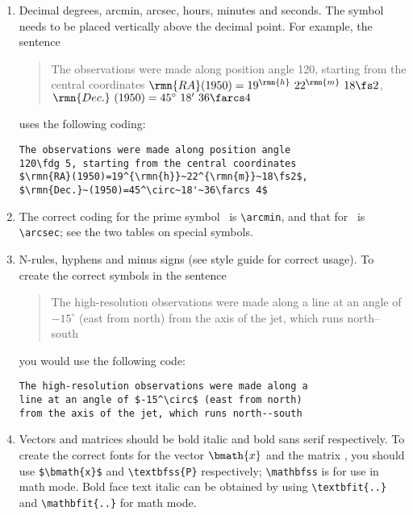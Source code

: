 \begin{enumerate}
\item Decimal degrees, arcmin, arcsec, hours, minutes and seconds. 
The symbol needs to be placed vertically above the decimal point. 
For example, the sentence
%
\begin{quote}
The observations were made along position angle
120, starting from the central coordinates
$\rmn{RA}(1950)=19^{\rmn{h}}~22^{\rmn{m}}~18\fs2$,
$\rmn{Dec.}~(1950)=45^\circ~18'~36\farcs 4$
\end{quote}
%        
uses the following coding:
%
\begin{verbatim}
The observations were made along position angle
120\fdg 5, starting from the central coordinates
$\rmn{RA}(1950)=19^{\rmn{h}}~22^{\rmn{m}}~18\fs2$,
$\rmn{Dec.}~(1950)=45^\circ~18'~36\farcs 4$
\end{verbatim}

\item The correct coding for the prime symbol \arcmin\ is 
\verb"\arcmin", and that for \arcsec\ is \verb"\arcsec"; see the two
tables on special symbols.
        
\item N-rules, hyphens and minus signs (see style guide for  
correct usage). To create the correct symbols in the sentence
%        
\begin{quote}
The high-resolution observations were made along a
line at an angle of $-15^\circ$ (east from north)
from the axis of the jet, which runs north--south
\end{quote}
you would use the following code:
%
\begin{verbatim}
The high-resolution observations were made along a
line at an angle of $-15^\circ$ (east from north)
from the axis of the jet, which runs north--south
\end{verbatim}

\item Vectors and matrices should be bold italic and bold sans
serif respectively. To create the correct fonts for the vector $\bmath{x}$
and the matrix , you should use \verb"$\bmath{x}$" and
\verb"\textbfss{P}" respectively; \verb"\mathbfss" is for use in
math mode. Bold face text italic can be obtained by using
\verb"\textbfit{..}" and \verb"\mathbfit{..}" for math mode.
        

\end{enumerate}
